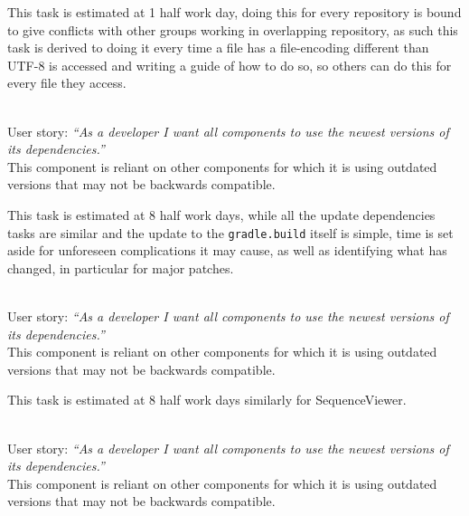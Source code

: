 \begin{description}[style=unboxed]
        This task is estimated at 1 half work day, doing this for every repository is bound to give conflicts with other groups working in overlapping repository, as such this task is derived to doing it every time a file has a file-encoding different than UTF-8 is accessed and writing a guide of how to do so, so others can do this for every file they access. 
    \item[SequenceViewer - Update dependencies] \hfill \\
        User story: \textit{``As a developer I want all components to use the newest versions of its dependencies.''} \\
        This component is reliant on other components for which it is using outdated versions that may not be backwards compatible.

        This task is estimated at 8 half work days, while all the update dependencies tasks are similar and the update to the \texttt{gradle.build} itself is simple, time is set aside for unforeseen complications it may cause, as well as identifying what has changed, in particular for major patches.
    \item[Sequence - Update dependencies] \hfill \\ 
        User story: \textit{``As a developer I want all components to use the newest versions of its dependencies.''} \\
        This component is reliant on other components for which it is using outdated versions that may not be backwards compatible.

        This task is estimated at 8 half work days similarly for SequenceViewer.
    \item[Picto Search - Update dependencies] \hfill \\
        User story: \textit{``As a developer I want all components to use the newest versions of its dependencies.''} \\
        This component is reliant on other components for which it is using outdated versions that may not be backwards compatible.


\end{description}
